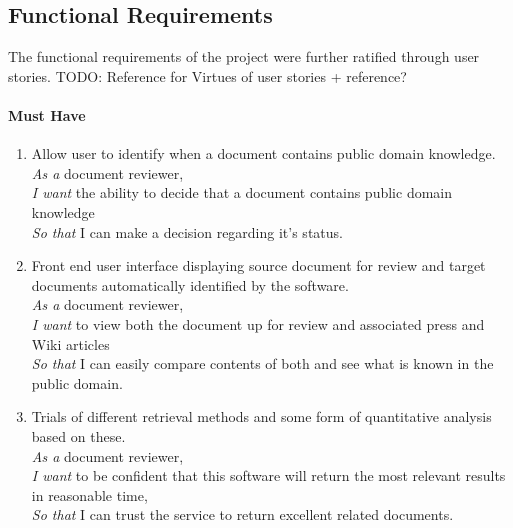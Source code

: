 \documentclass{l4proj}
\begin{document}
\subsection{Functional Requirements}
The functional requirements of the project were further ratified through user stories. 
TODO: Reference for Virtues of user stories + reference?
\paragraph{Must Have\\}
\begin{enumerate}[label=\textbf{M.\arabic*}]
\item Allow user to identify when a document contains public domain knowledge. \\
\textit{As a} document reviewer, \\
\textit{I want} the ability to decide that a document contains public domain knowledge \\
\textit{So that} I can make a decision regarding it's status. \\

\item Front end user interface displaying source document for review and target documents automatically identified by the software. \\
\textit{As a} document reviewer, \\
\textit{I want} to view both the document up for review and associated press and Wiki articles \\
\textit{So that} I can easily compare contents of both and see what is known in the public domain. \\
\item Trials of different retrieval methods and some form of quantitative analysis based on these. \\
\textit{As a} document reviewer, \\
\textit{I want} to be confident that this software will return the most relevant results in reasonable time, \\
\textit{So that} I can trust the service to return excellent related documents.
\end{enumerate}
\end{document}
